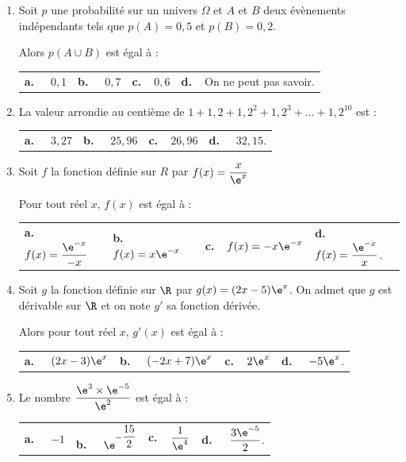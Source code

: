 \begin{enumerate}
\item Soit $p$ une probabilité sur un univers $\Omega$ et $A$ et $B$ deux évènements indépendants tels que
$p(A) = 0,5$ et $p(B) = 0,2$.

Alors $p(A\cup B)$ est égal à :

\begin{center}
\begin{tabularx}{\linewidth}{*{4}{X}}
\textbf{a.~~} $0,1$ &\textbf{b.~~} $0,7$&\textbf{c.~~}$0,6$& \textbf{d.~~}On ne peut pas savoir.
\end{tabularx}
\end{center}

\item La valeur arrondie au centième de $1 + 1,2 + 1,2^2 + 1,2^3 + \dots + 1,2^{10}$ est :

\begin{center}
\begin{tabularx}{\linewidth}{*{4}{X}}
\textbf{a.~~} $3,27$ &\textbf{b.~~} $25,96$&\textbf{c.~~}$26,96$& \textbf{d.~~} $32,15$.
\end{tabularx}
\end{center}

\item Soit $f$ la fonction définie sur $R$ par $f(x) =\dfrac{x}{\e^x}$

Pour tout réel $x$, $f(x)$ est égal à :

\begin{center}
\begin{tabularx}{\linewidth}{*{4}{X}}
\textbf{a.~~} $f(x) = \dfrac{\e^{-x}}{-x}$ &\textbf{b.~~} $f(x) = x\e^{-x}$&\textbf{c.~~}$f(x) = -x\e^{-x}$& \textbf{d.~~} $f(x) = \dfrac{\e^{-x}}{x}$.
\end{tabularx}
\end{center}

\item Soit $g$ la fonction définie sur $\R$ par $g(x) = (2x - 5)\e^x$. On admet que $g$ est dérivable sur $\R$
et on note $g'$ sa fonction dérivée.

Alors pour tout réel $x$, $g'(x)$ est égal à :

\begin{center}
\begin{tabularx}{\linewidth}{*{4}{X}}
\textbf{a.~~} $(2x -3)\e^x$ &\textbf{b.~~} $(-2x + 7)\e^x$&\textbf{c.~~}$2\e^x$& \textbf{d.~~} $-5\e^x$.
\end{tabularx}
\end{center}

\item  Le nombre $\dfrac{\e^3\times \e^{-5}}{\e^2}$ est égal à :

\begin{center}
\begin{tabularx}{\linewidth}{*{4}{X}}
\textbf{a.~~} $ -1 $ &\textbf{b.~~} $\e^{-\dfrac{15}{2}}$&\textbf{c.~~}$ \dfrac{1}{\e^{4}}$& \textbf{d.~~} $\dfrac{3 \e^{-5}}{2} $.
\end{tabularx}
\end{center}

\end{enumerate}

\vspace{0,5cm}
